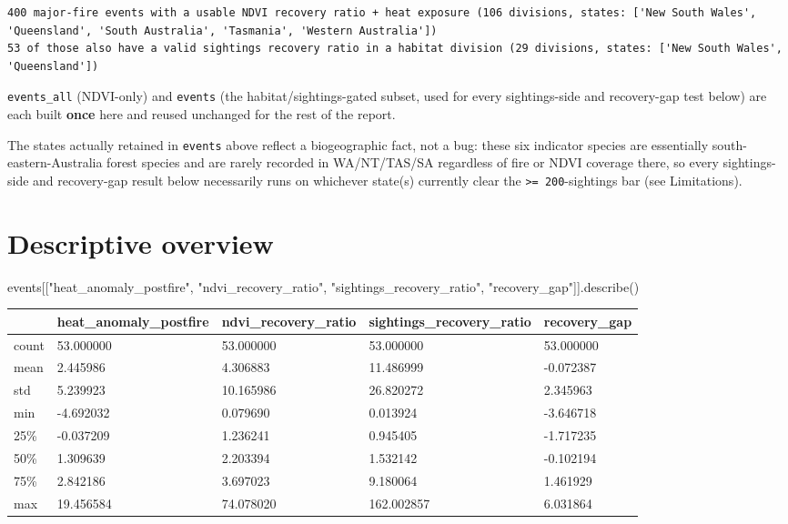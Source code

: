 \documentclass[
  letterpaper,
  DIV=11,
  numbers=noendperiod]{scrartcl}
\newenvironment{Shaded}{\begin{snugshade}}{\end{snugshade}}
\newcommand{\NormalTok}[1]{\textcolor[rgb]{0.00,0.23,0.31}{#1}}
\newcommand{\StringTok}[1]{\textcolor[rgb]{0.13,0.47,0.30}{#1}}
\begin{document}
\begin{verbatim}
400 major-fire events with a usable NDVI recovery ratio + heat exposure (106 divisions, states: ['New South Wales', 'Queensland', 'South Australia', 'Tasmania', 'Western Australia'])
53 of those also have a valid sightings recovery ratio in a habitat division (29 divisions, states: ['New South Wales', 'Queensland'])
\end{verbatim}

\texttt{events\_all} (NDVI-only) and \texttt{events} (the
habitat/sightings-gated subset, used for every sightings-side and
recovery-gap test below) are each built \textbf{once} here and reused
unchanged for the rest of the report.

The states actually retained in \texttt{events} above reflect a
biogeographic fact, not a bug: these six indicator species are
essentially south-eastern-Australia forest species and are rarely
recorded in WA/NT/TAS/SA regardless of fire or NDVI coverage there, so
every sightings-side and recovery-gap result below necessarily runs on
whichever state(s) currently clear the
\texttt{\textgreater{}=\ 200}-sightings bar (see Limitations).

\section{Descriptive overview}\label{descriptive-overview}

\begin{Shaded}
\begin{Highlighting}[]
\NormalTok{events[[}\StringTok{"heat\_anomaly\_postfire"}\NormalTok{, }\StringTok{"ndvi\_recovery\_ratio"}\NormalTok{, }\StringTok{"sightings\_recovery\_ratio"}\NormalTok{, }\StringTok{"recovery\_gap"}\NormalTok{]].describe()}
\end{Highlighting}
\end{Shaded}

\begin{longtable}[]{@{}lllll@{}}
\toprule\noalign{}
& heat\_anomaly\_postfire & ndvi\_recovery\_ratio &
sightings\_recovery\_ratio & recovery\_gap \\
\midrule\noalign{}
\endhead
\bottomrule\noalign{}
\endlastfoot
count & 53.000000 & 53.000000 & 53.000000 & 53.000000 \\
mean & 2.445986 & 4.306883 & 11.486999 & -0.072387 \\
std & 5.239923 & 10.165986 & 26.820272 & 2.345963 \\
min & -4.692032 & 0.079690 & 0.013924 & -3.646718 \\
25\% & -0.037209 & 1.236241 & 0.945405 & -1.717235 \\
50\% & 1.309639 & 2.203394 & 1.532142 & -0.102194 \\
75\% & 2.842186 & 3.697023 & 9.180064 & 1.461929 \\
max & 19.456584 & 74.078020 & 162.002857 & 6.031864 \\
\end{longtable}
\end{document}
